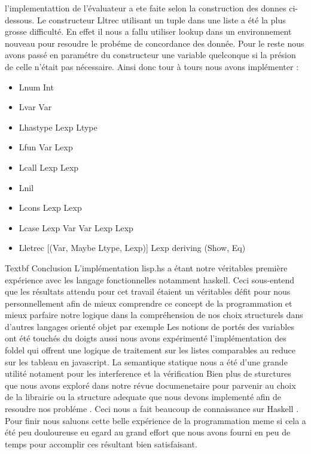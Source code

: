 \documentclass{article}
\begin{document}
l'implementattion de l'évaluateur a ete faite selon la construction des donnes ci- dessous. 
Le constructeur Lltrec utilisant un tuple dans une liste a été la plus grosse difficulté.
En effet il nous a fallu utiliser lookup dans un environnement nouveau pour resoudre le probéme de 
concordance des donnée.
Pour le reste nous avons passé en paramétre du constructeur une variable quelconque si la présion de celle
n'était pas nécessaire.
Ainsi donc tour à tours nous avons implémenter :

\begin{itemize}  
\item Lnum Int 
\item Lvar Var
\item Lhastype Lexp Ltype
\item Lfun Var Lexp
\item Lcall Lexp Lexp
\item Lnil
\item Lcons Lexp Lexp
 \item Lcase Lexp Var Var Lexp Lexp
\item Lletrec [(Var, Maybe Ltype, Lexp)] Lexp deriving (Show, Eq)
\end{itemize}

\newpage
 Textbf {Conclusion }
L’implémentation lisp.hs a étant notre véritables première expérience avec les langage fonctionnelles notamment haskell. Ceci sous-entend que les résultats attendu pour cet travail étaient un véritables défit pour nous personnellement afin de mieux comprendre ce concept de la programmation et mieux parfaire notre logique dans la compréhension de nos choix structurels dans d’autres langages orienté objet par exemple Les notions de portés des variables ont été touchés du doigts aussi nous avons expérimenté l’implémentation  des foldel qui offrent une logique de traitement sur les listes comparables au reduce sur les tableau en javascript.
La semantique statique nous a été d'une grande utilité notament pour les interference et la vérification
Bien plus de sturctures que nous avons exploré  dans notre révue documenetaire pour parvenir au choix de la librairie ou la structure adequate 
que nous devons implementé afin de resoudre nos probléme . Ceci nous a fait beaucoup de connaissance sur Haskell .
Pour finir nous saluons cette belle expérience de la programmation meme si cela a été peu douloureuse eu egard au grand effort que nous avons
fourni en peu de temps pour accomplir ces résultant bien satisfaisant. 
\end{document}
